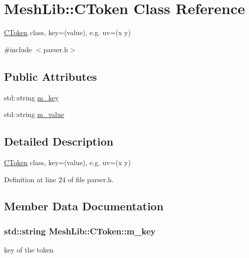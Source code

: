 \hypertarget{class_mesh_lib_1_1_c_token}{}\section{Mesh\+Lib\+:\+:C\+Token Class Reference}
\label{class_mesh_lib_1_1_c_token}


\hyperlink{class_mesh_lib_1_1_c_token}{C\+Token} class, key=(value), e.\+g. uv=(x y)  




{\ttfamily \#include $<$parser.\+h$>$}

\subsection*{Public Attributes}
\begin{DoxyCompactItemize}
\item 
std\+::string \hyperlink{class_mesh_lib_1_1_c_token_a239388f9ad2ccb0985e069754606655e}{m\+\_\+key}
\item 
std\+::string \hyperlink{class_mesh_lib_1_1_c_token_a93193611239a7d9f5eba7d002dcd93e9}{m\+\_\+value}
\end{DoxyCompactItemize}


\subsection{Detailed Description}
\hyperlink{class_mesh_lib_1_1_c_token}{C\+Token} class, key=(value), e.\+g. uv=(x y) 

Definition at line 24 of file parser.\+h.



\subsection{Member Data Documentation}
\subsubsection[{\texorpdfstring{m\+\_\+key}{m_key}}]{\setlength{\rightskip}{0pt plus 5cm}std\+::string Mesh\+Lib\+::\+C\+Token\+::m\+\_\+key}\hypertarget{class_mesh_lib_1_1_c_token_a239388f9ad2ccb0985e069754606655e}{}\label{class_mesh_lib_1_1_c_token_a239388f9ad2ccb0985e069754606655e}
key of the token 

